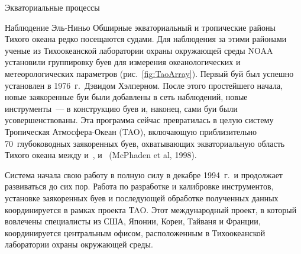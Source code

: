 \begin{chapter}{Экваториальные процессы}
\begin{section}{Наблюдение Эль-Ниньо}
%
Обширные экваториальный и тропические районы Тихого океана редко
посещаются судами. Для наблюдения за этими районами ученые из
Тихоокеанской лаборатории охраны окружающей среды NOAA 
установили группировку буев для измерения океанологических и
метеорологических параметров (рис.~\ref{fig:TaoArray}). Первый буй был успешно
установлен в 1976~г.\ Дэвидом Хэлперном. После этого простейшего
начала, новые заякоренные буи были добавлены в сеть наблюдений, новые
инструменты~--- в конструкцию буев и, наконец, сами буи
были усовершенствованы. Эта программа сейчас превратилась в целую
систему Тропическая Атмосфера-Океан (TAO), включающую приблизительно
70~глубоководных заякоренных буев, охватывающих
экваториальную область Тихого океана между  и~, 
 и~ (McPhaden et al, 1998).
%

Система начала свою работу в полную силу в декабре 1994~г.\ и 
продолжает развиваться до сих пор. Работа по разработке и калибровке
инструментов, установке заякоренных буев и последующей обработке
полученных данных координируется в рамках проекта TAO. Этот международный
проект, в который вовлечены специалисты из США, Японии, Кореи, Тайваня 
и Франции, координируется центральным офисом, расположенным
в Тихоокеанской лаборатории охраны окружающей среды.
%


\end{section}
\end{chapter}
